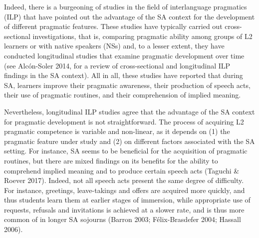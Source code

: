 \documentclass[12pt]{article}
\newenvironment{styleStandard}{\setlength\leftskip{0cm}\setlength\rightskip{0cm plus 1fil}\setlength\parindent{0cm}\setlength\parfillskip{0pt plus 1fil}\setlength\parskip{0in plus 1pt}\writerlistparindent\writerlistleftskip\leavevmode\normalfont\normalsize\writerlistlabel\ignorespaces}{\unskip\vspace{0.111in plus 0.0111in}\par}
\newcommand\writerlistleftskip{}
\newcommand\writerlistparindent{}
\newcommand\writerlistlabel{}
\begin{document}
\begin{styleStandard}
Indeed, there is a burgeoning of studies in the field of interlanguage pragmatics (ILP) that have pointed out the advantage of the SA context for the development of different pragmatic features. These studies have typically carried out cross-sectional investigations, that is, comparing pragmatic ability among groups of L2 learners or with native speakers (NSs) and, to a lesser extent, they have conducted longitudinal studies that examine pragmatic development over time (see Alcón-Soler 2014, for a review of cross-sectional and longitudinal ILP findings in the SA context). All in all, these studies have reported that during SA, learners improve their pragmatic awareness, their production of speech acts, their use of pragmatic routines, and their comprehension of implied meaning. 
\end{styleStandard}

\begin{styleStandard}
Nevertheless, longitudinal ILP studies agree that the advantage of the SA context for pragmatic development is not straightforward. The process of acquiring L2 pragmatic competence is variable and non-linear, as it depends on (1) the pragmatic feature under study and (2) on different factors associated with the SA setting. For instance, SA seems to be beneficial for the acquisition of pragmatic routines, but there are mixed findings on its benefits for the ability to comprehend implied meaning and to produce certain speech acts (Taguchi \& Roever 2017). Indeed, not all speech acts present the same degree of difficulty. For instance, greetings, leave-takings and offers are acquired more quickly, and thus students learn them at earlier stages of immersion, while appropriate use of requests, refusals and invitations is achieved at a slower rate, and is thus more common of in longer SA sojourns (Barron 2003; Félix-Brasdefer 2004; Hassall 2006).
\end{styleStandard}
\end{document}
